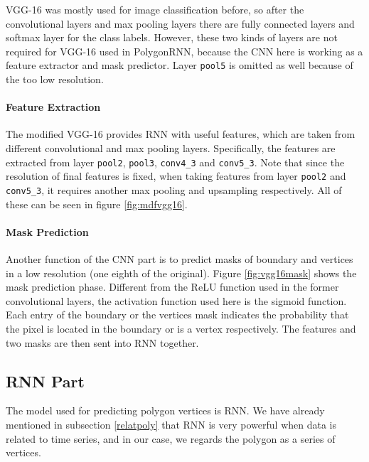 

VGG-16 was mostly used for image classification before, so after the convolutional layers and max pooling layers there are fully connected layers and softmax layer for the class labels. However, these two kinds of layers are not required for VGG-16 used in PolygonRNN, because the CNN here is working as a feature extractor and mask predictor. Layer \lstinline{pool5} is omitted as well because of the too low resolution.

\paragraph{Feature Extraction} The modified VGG-16 provides RNN with useful features, which are taken from different convolutional and max pooling layers. Specifically, the features are extracted from layer \lstinline{pool2}, \lstinline{pool3}, \lstinline{conv4_3} and \lstinline{conv5_3}. Note that since the resolution of final features is fixed, when taking features from layer \lstinline{pool2} and \lstinline{conv5_3}, it requires another max pooling and upsampling respectively. All of these can be seen in figure \ref{fig:mdfvgg16}.



\paragraph{Mask Prediction}
Another function of the CNN part is to predict masks of boundary and vertices in a low resolution (one eighth of the original). Figure \ref{fig:vgg16mask} shows the mask prediction phase. Different from the ReLU function used in the former convolutional layers, the activation function used here is the sigmoid function. Each entry of the boundary or the vertices mask indicates the probability that the pixel is located in the boundary or is a vertex respectively. The features and two masks are then sent into RNN together.


\subsection{RNN Part}\label{modrnn}
The model used for predicting polygon vertices is RNN. We have already mentioned in subsection \ref{relatpoly} that RNN is very powerful when data is related to time series, and in our case, we regards the polygon as a series of vertices.

